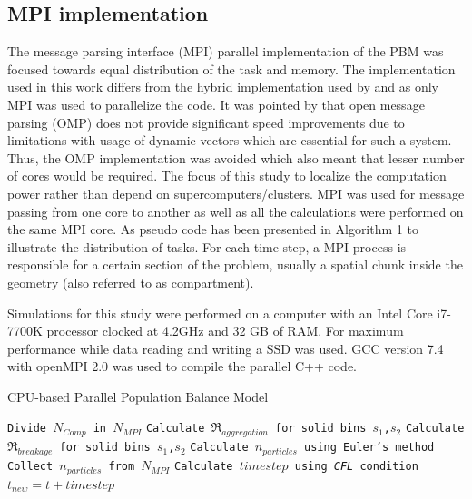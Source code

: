 \documentclass[preprint,10pt,authoryear,review]{elsarticle}
\begin{document}
\subsection{MPI implementation}
The message parsing interface (MPI) parallel implementation of the PBM was 
focused towards equal distribution of the task and memory. The implementation 
used in this work differs from the hybrid implementation used by \citep{Bettencourt2017}
and \citep{Sampat2018} as only MPI was used to parallelize the code. It 
was pointed by \citep{Sampat2018} that open message parsing (OMP) does not 
provide significant speed improvements due to limitations with usage of 
dynamic vectors which are essential for such a system. Thus, the OMP 
implementation was avoided which also meant that lesser number of cores 
would be required. The focus of this study to localize the computation power 
rather than depend on supercomputers/clusters. MPI was used for message passing 
from one core to another as well as all the calculations  
were performed on the same MPI core. As pseudo code has been presented in Algorithm 1 
to illustrate the distribution of tasks. For each time step, a MPI process is responsible 
for a certain section of the problem, usually a spatial chunk inside the geometry 
(also referred to as compartment).  



Simulations for this study were performed on a computer with an Intel Core i7-7700K 
processor clocked at 4.2GHz and 32 GB of RAM. For maximum performance while 
data reading and writing a SSD was used. GCC version 7.4 with openMPI 2.0 
was used to compile the parallel C++ code.

\begin{algorithm}
     \scriptsize
     \caption{CPU-based Parallel Population Balance Model}
     \label{alg:CPUparallelPBM}
     \begin{algorithmic}[1]
     \State \texttt{Divide $N_{Comp}$ in $N_{MPI}$}
     \State \texttt{Calculate $\Re_{aggregation}$ for solid bins $s_1$,$s_2$}
     \State \texttt{Calculate $\Re_{breakage}$ for solid bins $s_1$,$s_2$}
     \State \texttt{Calculate $n_{particles}$ using Euler's method}
     \EndFor
     \State \texttt{Collect $n_{particles}$ from $N_{MPI}$}
     \State \texttt{Calculate $timestep$ using \textit{CFL} condition}
     \State \texttt{$t_{new} = t + timestep$ }
     \EndWhile
     \EndProcedure
     \end{algorithmic}
 \end{algorithm}   
\end{document}
